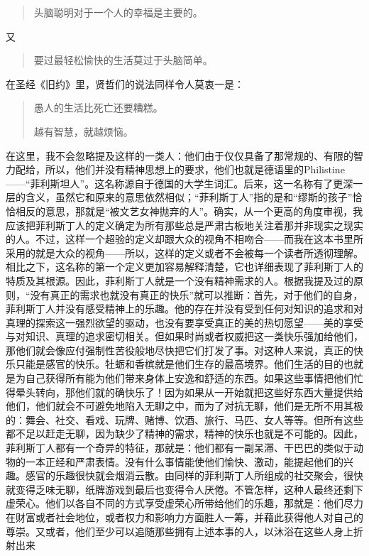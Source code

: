 \documentclass[12pt,oneside]{book}
\begin{document}
\begin{quotation}
头脑聪明对于一个人的幸福是主要的。 
\end{quotation}


又 

\begin{quotation}
要过最轻松愉快的生活莫过于头脑简单。 
\end{quotation}

 

在圣经《旧约》里，贤哲们的说法同样令人莫衷一是： 

\begin{quotation}
愚人的生活比死亡还要糟糕。

越有智慧，就越烦恼。 
\end{quotation}


在这里，我不会忽略提及这样的一类人：他们由于仅仅具备了那常规的、有限的智力配给，所以，他们并没有精神思想上的要求，他们也就是德语里的Philistine——“菲利斯坦人”。这名称源自于德国的大学生词汇。后来，这一名称有了更深一层的含义，虽然它和原来的意思依然相似；“菲利斯丁人”指的是和“缪斯的孩子”恰恰相反的意思，那就是“被文艺女神抛弃的人”。确实，从一个更高的角度审视，我应该把菲利斯丁人的定义确定为所有那些总是严肃古板地关注着那并非现实之现实的人。不过，这样一个超验的定义却跟大众的视角不相吻合——而我在这本书里所采用的就是大众的视角——所以，这样的定义或者不会被每一个读者所透彻理解。相比之下，这名称的第一个定义更加容易解释清楚，它也详细表现了菲利斯丁人的特质及其根源。因此，菲利斯丁人就是一个没有精神需求的人。根据我提及过的原则，“没有真正的需求也就没有真正的快乐”就可以推断：首先，对于他们的自身，菲利斯丁人并没有感受精神上的乐趣。他的存在并没有受到任何对知识的追求和对真理的探索这一强烈欲望的驱动，也没有要享受真正的美的热切愿望——美的享受与对知识、真理的追求密切相关。但如果时尚或者权威把这一类快乐强加给他们，那他们就会像应付强制性苦役般地尽快把它们打发了事。对这种人来说，真正的快乐只能是感官的快乐。牡蛎和香槟就是他们生存的最高境界。他们生活的目的也就是为自己获得所有能为他们带来身体上安逸和舒适的东西。如果这些事情把他们忙得晕头转向，那他们就的确快乐了！因为如果从一开始就把这些好东西大量提供给他们，他们就会不可避免地陷入无聊之中，而为了对抗无聊，他们是无所不用其极的：舞会、社交、看戏、玩牌、赌博、饮酒、旅行、马匹、女人等等。但所有这些都不足以赶走无聊，因为缺少了精神的需求，精神的快乐也就是不可能的。因此，菲利斯丁人都有一个奇异的特征，那就是：他们都有一副呆滞、干巴巴的类似于动物的一本正经和严肃表情。没有什么事情能使他们愉快、激动，能提起他们的兴趣。感官的乐趣很快就会烟消云散。由同样的菲利斯丁人所组成的社交聚会，很快就变得乏味无聊，纸牌游戏到最后也变得令人厌倦。不管怎样，这种人最终还剩下虚荣心。他们以各自不同的方式享受虚荣心所带给他们的乐趣，那就是：他们尽力在财富或者社会地位，或者权力和影响力方面胜人一筹，并藉此获得他人对自己的尊崇。又或者，他们至少可以追随那些拥有上述本事的人，以沐浴在这些人身上折射出来
\end{document}
